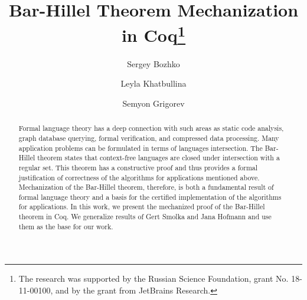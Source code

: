 \documentclass[runningheads]{llncs}
\begin{document}
%
\title{Bar-Hillel Theorem Mechanization in Coq\thanks{The research was supported by the Russian Science Foundation, grant
  No. 18-11-00100, and by the grant from JetBrains Research.}}
%
%
\author{Sergey Bozhko \and
Leyla Khatbullina \and 
Semyon Grigorev}
%
%
%
\maketitle              %
%
\begin{abstract}
Formal language theory has a deep connection with such areas as static code analysis, graph database querying, formal verification, and compressed data processing.
Many application problems can be formulated in terms of languages intersection.
The Bar-Hillel theorem states that context-free languages are closed under intersection with a regular set.
This theorem has a constructive proof and thus provides a formal justification of correctness of the algorithms for applications mentioned above. 
Mechanization of the Bar-Hillel theorem, therefore, is both a fundamental result of formal language theory and a basis for the certified implementation of the algorithms for applications.
In this work, we present the mechanized proof of the Bar-Hillel theorem in Coq.
We generalize results of Gert Smolka and Jana Hofmann and use them as the base for our work.

\end{abstract}
%
%
%


%




%
%
%
 
 
%
\end{document}
